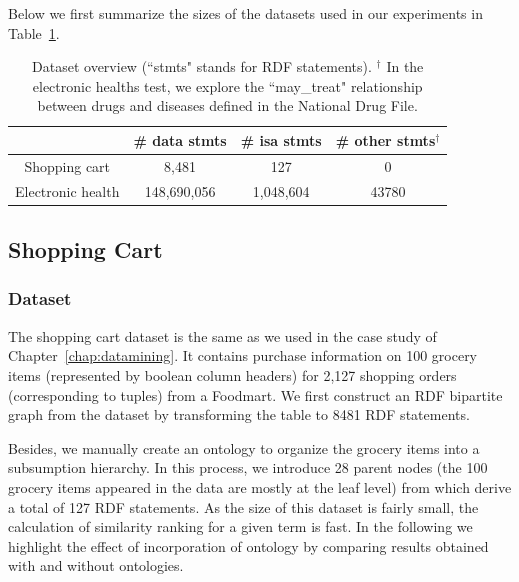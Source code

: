 Below we first summarize the sizes of the datasets used in our experiments in Table~\ref{tbl:exp_overview}.

\begin{table}[tbh]\scriptsize
\begin{center}
\begin{tabular}{c|c|c|c}
\hline
    & \# data stmts & \# isa stmts & \# other stmts$^\dag$ \\
    \hline
  Shopping cart     &  8,481       & 127       &    0\\
  Electronic health &  148,690,056  & 1,048,604 &    43780\\
  \hline
\end{tabular}
\end{center}
\caption[Overview of the test cases.]{\label{tbl:exp_overview} Dataset overview (``stmts" stands for RDF statements). $^\dag$ In the electronic healths test, we explore the ``may\_treat" relationship between drugs and diseases defined in the National Drug File.}
\end{table}


\subsection{Shopping Cart}
\subsubsection{Dataset}
The shopping cart dataset is the same as we used in the case study of Chapter~\ref{chap:datamining}. It contains purchase information on 100 grocery items (represented by boolean column headers) for 2,127 shopping orders (corresponding to tuples) from a Foodmart. We first construct an RDF bipartite graph from the dataset by transforming the table to 8481 RDF statements.

Besides, we manually create an ontology to organize the grocery items into a subsumption hierarchy. In this process, we introduce 28 parent nodes (the 100 grocery items appeared in the data are mostly at the leaf level) from which derive a total of 127 RDF statements. As the size of this dataset is fairly small, the calculation of similarity ranking for a given term is fast. In the following we highlight the effect of incorporation of ontology by comparing results obtained with and without ontologies.


